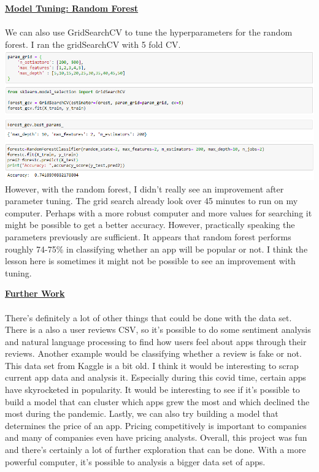\documentclass[11pt]{article}
\begin{document}
\underline{\textbf{Model Tuning: Random Forest}}\\ \\
We can also use GridSearchCV to tune the hyperparameters for the random forest. I ran the gridSearchCV with 5 fold CV. \\
\includegraphics[scale=0.65]{foresty2} \\
\includegraphics[scale=0.65]{foresty5} \\
\includegraphics[scale=0.65]{foresty10} \\
However, with the random forest, I didn't really see an improvement after parameter tuning. The grid search already look over 45 minutes to run on my computer. Perhaps with a more robust computer and more values for searching it might be possible to get a better accuracy. However, practically speaking the parameters previously are sufficient. It appears that random forest performs roughly 74-75\% in classifying whether an app will be popular or not. I think the lesson here is sometimes it might not be possible to see an improvement with tuning. 

\underline{\textbf{Further Work}}\\ \\
There's definitely a lot of other things that could be done with the data set. There is a also a user reviews CSV, so it's possible to do some sentiment analysis and natural language processing to find how users feel about apps through their reviews. Another example would be classifying whether a review is fake or not. This data set from Kaggle is a bit old. I think it would be interesting to scrap current app data and analysis it. Especially during this covid time, certain apps have skyrocketed in popularity. It would be interesting to see if it's possible to build a model that can cluster which apps grew the most and which declined the most during the pandemic. Lastly, we can also try building a model that determines the price of an app. Pricing competitively is important to companies and many of companies even have pricing analysts. Overall, this project was fun and there's certainly a lot of further exploration that can be done. With a more powerful computer, it's possible to analysis a bigger data set of apps.
\end{document}
